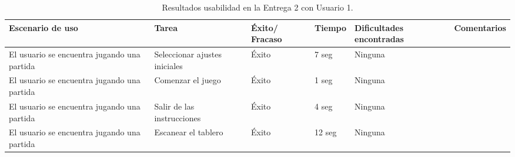 \begin{table}[h]
  \begin{center}
    \begin{tabular}{|p{2.5cm}|p{1.75cm}|p{1.25cm}|p{1.25cm}|p{2.75cm}|p{3.5cm}|}

      \hline
        \rowcolor{Gray} \textbf{Escenario de uso}
        & \textbf{Tarea}
        & \textbf{Éxito/ Fracaso}
        & \textbf{Tiempo}
        & \textbf{Dificultades encontradas}
        & \textbf{Comentarios}\\

      \hline
      El usuario se encuentra jugando una partida
      & Seleccionar ajustes iniciales
      & Éxito
      & 7 seg
      & Ninguna
      &\\

      \hline
      El usuario se encuentra jugando una partida
      & Comenzar el juego
      & Éxito
      & 1 seg
      & Ninguna
      &\\

      \hline
      El usuario se encuentra jugando una partida
      & Salir de las instrucciones
      & Éxito
      & 4 seg
      & Ninguna
      &\\

      \hline
      El usuario se encuentra jugando una partida
      & Escanear el tablero
      & Éxito
      & 12 seg
      & Ninguna
      &\\

      \hline

    \end{tabular}

    \caption{Resultados usabilidad en la Entrega 2 con Usuario 1.}
    \label{tabla-entrega-2-usuario1}

  \end{center}
\end{table}


